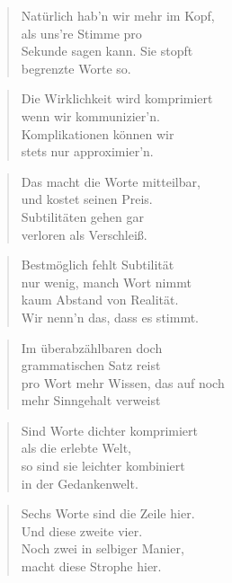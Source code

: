 \documentclass[10pt,a4paper]{article}
\begin{document}
\begin{paracol}{2}
\begin{verse}
Natürlich hab’n wir mehr im Kopf, \\
als uns’re Stimme pro \\
Sekunde sagen kann. Sie stopft \\
begrenzte Worte so. \\
\end{verse}

\begin{verse}
Die Wirklichkeit wird komprimiert \\
wenn wir kommunizier’n. \\
Komplikationen können wir \\
stets nur approximier’n. \\
\end{verse}

\begin{verse}
Das macht die Worte mitteilbar, \\
und kostet seinen Preis. \\
Subtilitäten gehen gar \\
verloren als Verschleiß. \\
\end{verse}

\begin{verse}
Bestmöglich fehlt Subtilität \\
nur wenig, manch Wort nimmt \\
kaum Abstand von Realität. \\
Wir nenn’n das, dass es stimmt. \\
\end{verse}

\begin{verse}
Im überabzählbaren doch \\
grammatischen Satz reist \\
pro Wort mehr Wissen, das auf noch \\
mehr Sinngehalt verweist \\
\end{verse}

\begin{verse}
Sind Worte dichter komprimiert \\
als die erlebte Welt, \\
so sind sie leichter kombiniert \\
in der Gedankenwelt. \\
\end{verse}

\begin{verse}
Sechs Worte sind die Zeile hier. \\
Und diese zweite vier. \\
Noch zwei in selbiger Manier, \\
macht diese Strophe hier. \\
\end{verse}


\end{paracol}
\end{document}
